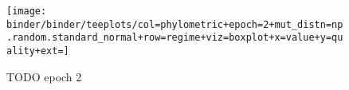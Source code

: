 \begin{sidewaysfigure*}
  \centering
  \texttt{[image: binder/binder/teeplots/col=phylometric+epoch=2+mut\_distn=np.random.standard\_normal+row=regime+viz=boxplot+x=value+y=quality+ext=]}
  \caption{TODO epoch 2}
  \label{fig:reconstructed-tree-phylometrics-epoch2}
\end{sidewaysfigure*}

